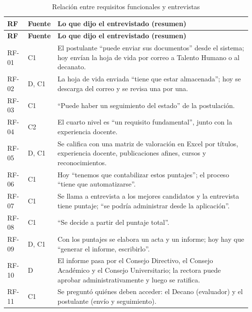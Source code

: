 {\small
\begin{longtable}{@{}p{1.6cm}p{1.2cm}p{11.8cm}@{}}
\caption{Relación entre requisitos funcionales y entrevistas}\\
\toprule
\textbf{RF} & \textbf{Fuente} & \textbf{Lo que dijo el entrevistado (resumen)} \\
\midrule
\endfirsthead
\toprule
\textbf{RF} & \textbf{Fuente} & \textbf{Lo que dijo el entrevistado (resumen)} \\
\midrule
\endhead
RF-01 & C1 & El postulante \enquote{puede enviar sus documentos} desde el sistema; hoy envían la hoja de vida por correo a Talento Humano o al decanato. \\
RF-02 & D, C1 & La hoja de vida enviada \enquote{tiene que estar almacenada}; hoy se descarga del correo y se revisa una por una. \\
RF-03 & C1 & \enquote{Puede haber un seguimiento del estado} de la postulación. \\
RF-04 & C2 & El cuarto nivel es \enquote{un requisito fundamental}, junto con la experiencia docente. \\
RF-05 & D, C1 & Se califica con una matriz de valoración en Excel por títulos, experiencia docente, publicaciones afines, cursos y reconocimientos. \\
RF-06 & C1 & Hoy \enquote{tenemos que contabilizar estos puntajes}; el proceso \enquote{tiene que automatizarse}. \\
RF-07 & C1 & Se llama a entrevista a los mejores candidatos y la entrevista tiene puntaje; \enquote{se podría administrar desde la aplicación}. \\
RF-08 & C1 & \enquote{Se decide a partir del puntaje total}. \\
RF-09 & D, C1 & Con los puntajes se elabora un acta y un informe; hoy hay que \enquote{generar el informe, escribirlo}. \\
RF-10 & D & El informe pasa por el Consejo Directivo, el Consejo Académico y el Consejo Universitario; la rectora puede aprobar administrativamente y luego se ratifica. \\
RF-11 & C1 & Se preguntó quiénes deben acceder: el Decano (evaluador) y el postulante (envío y seguimiento). \\
\bottomrule
\end{longtable}
}